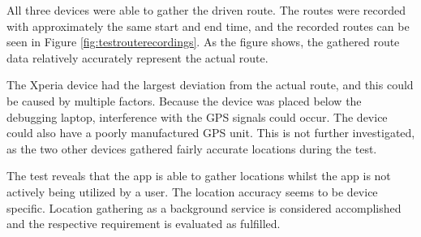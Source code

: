 All three devices were able to gather the driven route. 
The routes were recorded with approximately the same start and end time, and the recorded routes can be seen in Figure \ref{fig:testrouterecordings}. 
As the figure shows, the gathered route data relatively accurately represent the actual route.


The Xperia device had the largest deviation from the actual route, and this could be caused by multiple factors.
Because the device was placed below the debugging laptop, interference with the GPS signals could occur.
The device could also have a poorly manufactured GPS unit.
This is not further investigated, as the two other devices gathered fairly accurate locations during the test.



The test reveals that the app is able to gather locations whilst the app is not actively being utilized by a user.
The location accuracy seems to be device specific.
Location gathering as a background service is considered accomplished and the respective requirement is evaluated as fulfilled.

